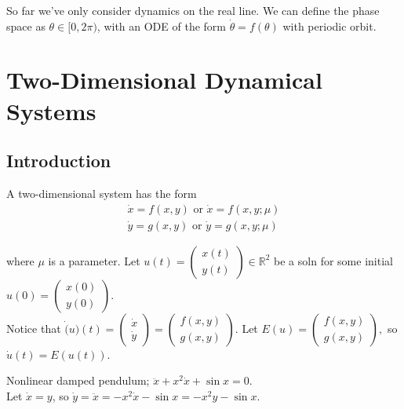 \documentclass[12pt, oneside]{article}
\begin{document}
So far we've only consider dynamics on the real line. We can define the phase space as $\theta \in [0, 2 \pi)$, with an ODE of the form $\dot{\theta} = f(\theta)$ with periodic orbit.

\section{Two-Dimensional Dynamical Systems}
\subsection{Introduction}
A two-dimensional system has the form 
\begin{align*}
  \dot{x} = f(x,y) \text{ or } \dot{x} = f(x,y;\mu)\\
  \dot{y} = g(x,y) \text{ or }\dot{y} = g(x,y;\mu)
\end{align*}

where $\mu$ is a parameter. Let $u(t) = \begin{pmatrix}
  x(t)\\
  y(t)
\end{pmatrix} \in \mathbb{R}^2$ be a soln for some initial $u(0) = \begin{pmatrix}
  x(0)\\
  y(0)
\end{pmatrix}$.\\
Notice that $\dot(u)(t) = \begin{pmatrix}
  \dot{x}\\
  \dot{y}
\end{pmatrix} = \begin{pmatrix}
  f(x,y)\\
  g(x,y)
\end{pmatrix}$. Let $E(u) = \begin{pmatrix}
  f(x,y)\\
  g(x,y)
\end{pmatrix},$ so $\dot{u}(t) = E(u(t))$.

\begin{example}
  Nonlinear damped pendulum; $\ddot{x} + x^2 \dot{x} + \sin x = 0$.\\
  Let $\dot{x} = y$, so $\dot{y} = \ddot{x} = -x^2 \dot{x} - \sin x = -x^2y-\sin x$.
\end{example}
\end{document}
